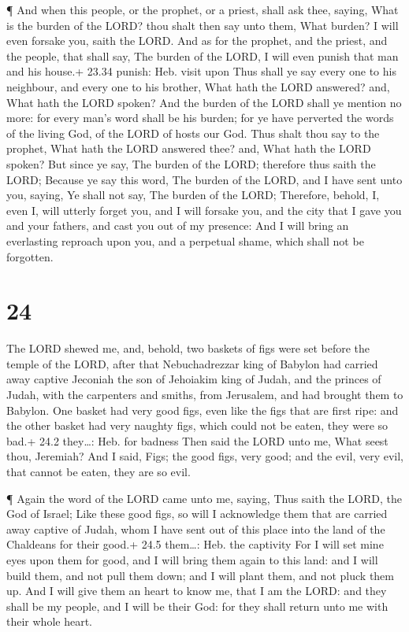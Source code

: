  ¶ And when this people, or the prophet, or a priest, shall
ask thee, saying, What is the burden of the LORD? thou shalt then say
unto them, What burden? I will even forsake you, saith the LORD.
 And as for the prophet, and the priest, and the people,
that shall say, The burden of the LORD, I will even punish that man and
his house.+ 23.34 punish: Heb. visit upon  Thus shall ye
say every one to his neighbour, and every one to his brother, What hath
the LORD answered? and, What hath the LORD spoken?  And the
burden of the LORD shall ye mention no more: for every man's word shall
be his burden; for ye have perverted the words of the living God, of the
LORD of hosts our God.  Thus shalt thou say to the prophet,
What hath the LORD answered thee? and, What hath the LORD spoken?
 But since ye say, The burden of the LORD; therefore thus
saith the LORD; Because ye say this word, The burden of the LORD, and I
have sent unto you, saying, Ye shall not say, The burden of the LORD;
 Therefore, behold, I, even I, will utterly forget you, and
I will forsake you, and the city that I gave you and your fathers, and
cast you out of my presence:  And I will bring an
everlasting reproach upon you, and a perpetual shame, which shall not be
forgotten.

\hypertarget{section-23}{%
\section{24}\label{section-23}}

 The LORD shewed me, and, behold, two baskets of figs were
set before the temple of the LORD, after that Nebuchadrezzar king of
Babylon had carried away captive Jeconiah the son of Jehoiakim king of
Judah, and the princes of Judah, with the carpenters and smiths, from
Jerusalem, and had brought them to Babylon.  One basket had
very good figs, even like the figs that are first ripe: and the other
basket had very naughty figs, which could not be eaten, they were so
bad.+ 24.2 they\ldots: Heb. for badness  Then said the LORD
unto me, What seest thou, Jeremiah? And I said, Figs; the good figs,
very good; and the evil, very evil, that cannot be eaten, they are so
evil.

 ¶ Again the word of the LORD came unto me, saying,
 Thus saith the LORD, the God of Israel; Like these good
figs, so will I acknowledge them that are carried away captive of Judah,
whom I have sent out of this place into the land of the Chaldeans for
their good.+ 24.5 them\ldots: Heb. the captivity  For I will
set mine eyes upon them for good, and I will bring them again to this
land: and I will build them, and not pull them down; and I will plant
them, and not pluck them up.  And I will give them an heart
to know me, that I am the LORD: and they shall be my people, and I will
be their God: for they shall return unto me with their whole heart.

